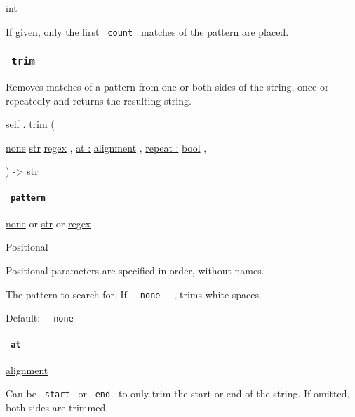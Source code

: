 \href{/docs/reference/foundations/int/}{int}

If given, only the first \texttt{\ count\ } matches of the pattern are
placed.

\subsubsection{\texorpdfstring{\texttt{\ trim\ }}{ trim }}\label{definitions-trim}

Removes matches of a pattern from one or both sides of the string, once
or repeatedly and returns the resulting string.

self { . } { trim } (

{ \href{/docs/reference/foundations/none/}{none}
\href{/docs/reference/foundations/str/}{str}
\href{/docs/reference/foundations/regex/}{regex} , } {
\hyperref[definitions-trim-parameters-at]{at :}
\href{/docs/reference/layout/alignment/}{alignment} , } {
\hyperref[definitions-trim-parameters-repeat]{repeat :}
\href{/docs/reference/foundations/bool/}{bool} , }

) -\textgreater{} \href{/docs/reference/foundations/str/}{str}

\paragraph{\texorpdfstring{\texttt{\ pattern\ }}{ pattern }}\label{definitions-trim-pattern}

\href{/docs/reference/foundations/none/}{none} {or}
\href{/docs/reference/foundations/str/}{str} {or}
\href{/docs/reference/foundations/regex/}{regex}

{{ Positional }}

\label{definitions-trim-pattern-positional-tooltip}
Positional parameters are specified in order, without names.

The pattern to search for. If \texttt{\ }{\texttt{\ none\ }}\texttt{\ }
, trims white spaces.

Default: \texttt{\ }{\texttt{\ none\ }}\texttt{\ }

\paragraph{\texorpdfstring{\texttt{\ at\ }}{ at }}\label{definitions-trim-at}

\href{/docs/reference/layout/alignment/}{alignment}

Can be \texttt{\ start\ } or \texttt{\ end\ } to only trim the start or
end of the string. If omitted, both sides are trimmed.

